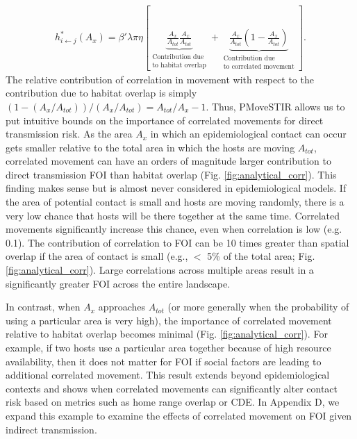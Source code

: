 ﻿\documentclass[11pt]{article}
\begin{document}
\begin{equation}
    \begin{aligned}
        h^*_{i \leftarrow j}(A_x) = \beta' \lambda \pi \eta \left[\underbrace{\frac{A_x}{A_{tot}}\frac{A_x}{A_{tot}}}_{\substack{\text{Contribution due} \\  \text{to habitat overlap}}} + \underbrace{\frac{A_x}{A_{tot}}(1 - \frac{A_x}{A_{tot}})}_{\substack{\text{Contribution due} \\ \text{to correlated movement}}} \right].
    \end{aligned}
    \label{eq:uniform_direct}
\end{equation}
The relative contribution of correlation in movement with respect to the contribution due to habitat overlap is simply $(1 - (A_x / A_{tot})) / (A_x / A_{tot})=A_{tot}/A_x-1$. 
Thus, PMoveSTIR allows us to put intuitive bounds on the importance of correlated movements for direct transmission risk. 
As the area $A_x$ in which an epidemiological contact can occur gets smaller relative to the total area in which the hosts are moving $A_{tot}$, correlated movement can have an orders of magnitude larger contribution to direct transmission FOI than habitat overlap (Fig. \ref{fig:analytical_corr}). 
This finding makes sense but is almost never considered in epidemiological models. If the area of potential contact is small and hosts are moving randomly, there is a very low chance that hosts will be there together at the same time. Correlated movements significantly increase this chance, even when correlation is low (e.g. 0.1). The contribution of correlation to FOI can be 10 times greater than spatial overlap if the area of contact is small (e.g., $<$ 5\% of the total area; Fig. \ref{fig:analytical_corr}). Large correlations across multiple areas result in a significantly greater FOI across the entire landscape. 

In contrast, when $A_x$ approaches $A_{tot}$ (or more generally when the probability of using a particular area is very high), the importance of correlated movement relative to habitat overlap becomes minimal (Fig. \ref{fig:analytical_corr}). For example, if two hosts use a particular area together because of high resource availability, then it does not matter for FOI if social factors are leading to additional correlated movement. This result extends beyond epidemiological contexts and shows when correlated movements can significantly alter contact risk based on metrics such as home range overlap or CDE.  In Appendix D, we expand this example to examine the effects of correlated movement on FOI given indirect transmission.
\end{document}
